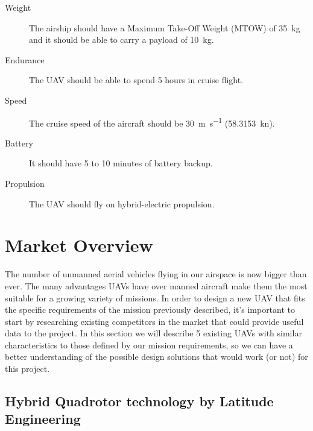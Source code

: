 \documentclass[english,fira]{ist-report}
\begin{document}
\begin{description}
	\item[Weight] The airship should have a Maximum Take-Off Weight (MTOW) of \SI{35}{\kilo\gram} and it should be able to carry a payload of \SI{10}{\kilo\gram}.
	\item [Endurance] The UAV should be able to spend 5 hours in cruise flight.
	\item[Speed] The cruise speed of the aircraft should be \SI{30}{\meter\per\second} (\SI{58.3153}{\knot}).
	\item[Battery] It should have 5 to 10 minutes of battery backup.
	\item[Propulsion] The UAV should fly on hybrid-electric propulsion.
\end{description}
\pagebreak
\chapter{Market Overview}

The number of unmanned aerial vehicles flying in our airspace is now bigger than ever. The many advantages UAVs have over manned aircraft make them the most suitable for a growing variety of missions. In order to design a new UAV that fits the specific requirements of the mission previously described, it's important to start by researching existing competitors in the market that could provide useful data to the project.  In this section we will describe 5 existing UAVs with similar characteristics to those defined by our mission requirements, so we can have a better understanding of the possible design solutions that would work (or not) for this project. 

\section{Hybrid Quadrotor technology by Latitude Engineering}
\end{document}
